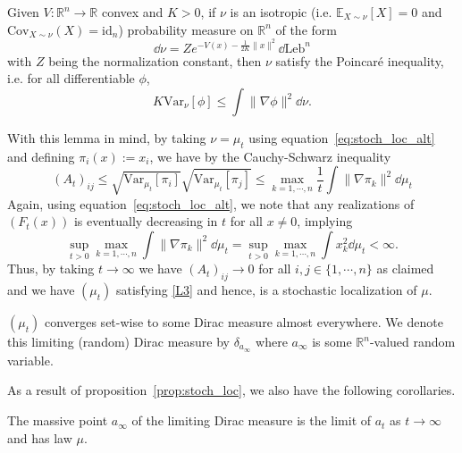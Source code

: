 \begin{lemma}\label{lem:brascamp-lieb}
  Given \(V : \mathbb{R}^n \to \mathbb{R}\) convex and \(K > 0\), if \(\nu\) is an isotropic 
  (i.e. \(\mathbb{E}_{X \sim \nu}[X] = 0\) and \(\text{Cov}_{X \sim \nu}(X) = \text{id}_n\)) probability 
  measure on \(\mathbb{R}^n\) of the form 
  \[\dd \nu = Ze^{-V(x) - \frac{1}{2K}\|x\|^2}\dd \text{Leb}^n\]
  with \(Z\) being the normalization constant, then \(\nu\) satisfy the Poincaré inequality, i.e. 
  for all differentiable \(\phi\),
  \[K\text{Var}_\nu[\phi] \le \int \|\nabla\phi\|^2 \dd\nu.\]
\end{lemma}

With this lemma in mind, by taking \(\nu = \mu_t\) using 
equation~\eqref{eq:stoch_loc_alt} and defining
\(\pi_i(x) := x_i\), we have by the Cauchy-Schwarz inequality
\[(A_t)_{ij} \le \sqrt{\text{Var}_{\mu_t}[\pi_i]}\sqrt{\text{Var}_{\mu_t}[\pi_j]} 
  \le \max_{k = 1, \cdots, n} \frac{1}{t}\int \|\nabla \pi_k\|^2 \dd \mu_t\]
Again, using equation~\eqref{eq:stoch_loc_alt}, we note that any realizations of \((F_t(x))\) is eventually 
decreasing in \(t\) for all \(x \neq 0\), implying 
\[\sup_{t > 0} \max_{k = 1, \cdots, n} \int \|\nabla \pi_k\|^2 \dd \mu_t = 
\sup_{t > 0} \max_{k = 1, \cdots, n} \int x_k^2 \dd \mu_t < \infty.\] 
Thus, by taking \(t \to \infty\) we have \((A_t)_{ij} \to 0\) for all \(i, j \in \{1, \cdots, n\}\) as claimed 
and we have \((\mu_t)\) satisfying \ref{L3} and hence, is a stochastic localization of \(\mu\).

\begin{corollary}
  \((\mu_t)\) converges set-wise to some Dirac measure almost everywhere. We denote this 
  limiting (random) Dirac measure by \(\delta_{a_\infty}\) where \(a_\infty\) is some 
  \(\mathbb{R}^n\)-valued random variable.
\end{corollary}

As a result of proposition~\ref{prop:stoch_loc}, we also have the following corollaries.

\begin{corollary}\label{cor:lim_dis}
  The massive point \(a_\infty\) of the limiting Dirac measure is the limit of \(a_t\) as 
  \(t \to \infty\) and has law \(\mu\).
\end{corollary}


